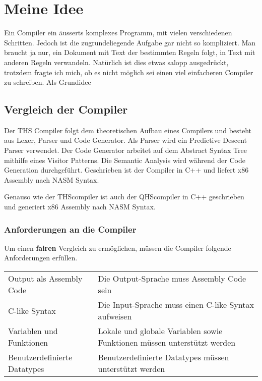 \chapter{Meine Idee}
Ein Compiler ein äusserts komplexes Programm, mit vielen verschiedenen Schritten. Jedoch ist die zugrundeliegende Aufgabe gar nicht so kompliziert.
Man braucht ja nur, ein Dokument mit Text der bestimmten Regeln folgt, in Text mit anderen Regeln verwandeln. Natürlich ist dies etwas salopp ausgedrückt, trotzdem fragte ich mich,
ob es nicht möglich sei einen viel einfacheren Compiler zu schreiben. Als Grundidee 

\section{Vergleich der Compiler}
Der THS Compiler folgt dem theoretischen Aufbau eines Compilers und besteht aus Lexer, Parser und Code Generator. Als Parser wird ein Predictive Descent Parser verwendet.
Der Code Generator arbeitet auf dem Abstract Syntax Tree mithilfe eines Visitor Patterns. Die Semantic Analysis wird während der Code Generation durchgeführt. Geschrieben ist der Compiler in C++ und liefert x86 Assembly nach NASM Syntax.

Genauso wie der THScompiler ist auch der QHScompiler in C++ geschrieben und generiert x86 Assembly nach NASM Syntax.

\subsection{Anforderungen an die Compiler}
Um einen \textbf{fairen} Vergleich zu ermöglichen, müssen die Compiler folgende Anforderungen erfüllen.

\begin{table}[h]
    \begin{tabular}{l|l}
    Output als Assembly Code     & Die Output-Sprache muss Assembly Code sein                               \\
    C-like Syntax                & Die Input-Sprache muss einen C-like Syntax aufweisen                     \\
    Variablen und Funktionen     & Lokale und globale Variablen sowie Funktionen müssen unterstützt werden  \\
    Benutzerdefinierte Datatypes & Benutzerdefinierte Datatypes müssen unterstützt werden                                 
    \end{tabular}
\end{table}

